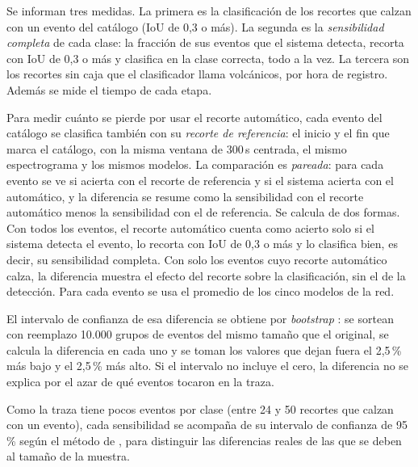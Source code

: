 Se informan tres medidas. La primera es la clasificación de los recortes que
calzan con un evento del catálogo (IoU de 0,3 o más). La segunda es la
\emph{sensibilidad completa} de cada clase: la fracción de sus eventos que el
sistema detecta, recorta con IoU de 0,3 o más y clasifica en la clase
correcta, todo a la vez. La tercera son los recortes sin caja que el
clasificador llama volcánicos, por hora de registro. Además se mide el tiempo
de cada etapa.

Para medir cuánto se pierde por usar el recorte automático, cada evento del
catálogo se clasifica también con su \emph{recorte de referencia}: el inicio y
el fin que marca el catálogo, con la misma ventana de 300\,s centrada, el mismo
espectrograma y los mismos modelos. La comparación es \emph{pareada}: para
cada evento se ve si acierta con el recorte de referencia y si el sistema
acierta con el automático, y la diferencia se resume como la sensibilidad con
el recorte automático menos la sensibilidad con el de referencia. Se calcula de
dos formas. Con todos los eventos, el recorte automático cuenta como acierto
solo si el sistema detecta el evento, lo recorta con IoU de 0,3 o más y lo
clasifica bien, es decir, su sensibilidad completa. Con solo los eventos cuyo
recorte automático calza, la diferencia muestra el efecto del recorte sobre la
clasificación, sin el de la detección. Para cada evento se usa el promedio de
los cinco modelos de la red.

El intervalo de confianza de esa diferencia se obtiene por \emph{bootstrap}
\parencite{efron1993bootstrap}: se sortean con reemplazo 10.000 grupos de
eventos del mismo tamaño que el original, se calcula la diferencia en cada uno
y se toman los valores que dejan fuera el 2,5\,\% más bajo y el 2,5\,\% más
alto. Si el intervalo no incluye el cero, la diferencia no se explica por el
azar de qué eventos tocaron en la traza.

Como la traza tiene pocos eventos por clase (entre 24 y 50 recortes que calzan
con un evento), cada sensibilidad se acompaña de su intervalo de confianza de
95\,\% según el método de \textcite{wilson1927}, para distinguir las
diferencias reales de las que se deben al tamaño de la muestra.
